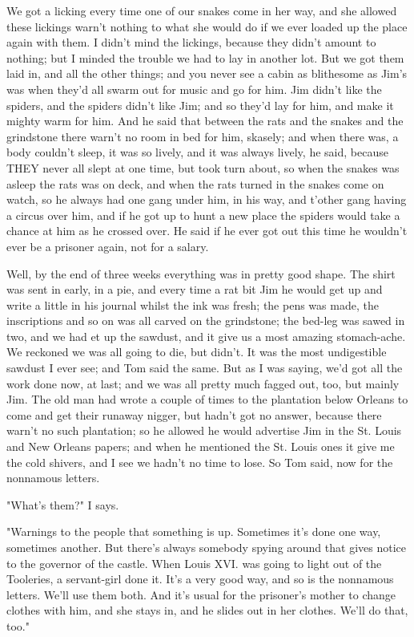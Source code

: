 We got a licking every time one of our snakes come in her way, and she
allowed these lickings warn't nothing to what she would do if we ever
loaded up the place again with them.  I didn't mind the lickings, because
they didn't amount to nothing; but I minded the trouble we had to lay in
another lot.  But we got them laid in, and all the other things; and you
never see a cabin as blithesome as Jim's was when they'd all swarm out
for music and go for him.  Jim didn't like the spiders, and the spiders
didn't like Jim; and so they'd lay for him, and make it mighty warm for
him.  And he said that between the rats and the snakes and the grindstone
there warn't no room in bed for him, skasely; and when there was, a body
couldn't sleep, it was so lively, and it was always lively, he said,
because THEY never all slept at one time, but took turn about, so when
the snakes was asleep the rats was on deck, and when the rats turned in
the snakes come on watch, so he always had one gang under him, in his
way, and t'other gang having a circus over him, and if he got up to hunt
a new place the spiders would take a chance at him as he crossed over.
He said if he ever got out this time he wouldn't ever be a prisoner
again, not for a salary.

Well, by the end of three weeks everything was in pretty good shape.  The
shirt was sent in early, in a pie, and every time a rat bit Jim he would
get up and write a little in his journal whilst the ink was fresh; the
pens was made, the inscriptions and so on was all carved on the
grindstone; the bed-leg was sawed in two, and we had et up the sawdust,
and it give us a most amazing stomach-ache.  We reckoned we was all going
to die, but didn't.  It was the most undigestible sawdust I ever see; and
Tom said the same.  But as I was saying, we'd got all the work done now,
at last; and we was all pretty much fagged out, too, but mainly Jim.  The
old man had wrote a couple of times to the plantation below Orleans to
come and get their runaway nigger, but hadn't got no answer, because
there warn't no such plantation; so he allowed he would advertise Jim in
the St. Louis and New Orleans papers; and when he mentioned the St. Louis
ones it give me the cold shivers, and I see we hadn't no time to lose.
So Tom said, now for the nonnamous letters.

"What's them?"  I says.

"Warnings to the people that something is up.  Sometimes it's done one
way, sometimes another.  But there's always somebody spying around that
gives notice to the governor of the castle.  When Louis XVI. was going to
light out of the Tooleries, a servant-girl done it.  It's a very good way,
and so is the nonnamous letters.  We'll use them both.  And it's usual
for the prisoner's mother to change clothes with him, and she stays in,
and he slides out in her clothes.  We'll do that, too."

